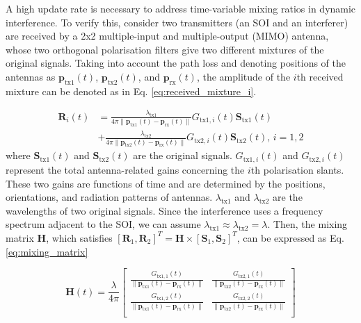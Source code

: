 \documentclass[pdflatex,mathphys]{sty}%
\begin{document}
A high update rate is necessary to address time-variable mixing ratios in dynamic interference. To verify this, consider two transmitters (an SOI and an interferer) are received by a 2x2 multiple-input and multiple-output (MIMO) antenna, whose two orthogonal polarisation filters give two different mixtures of the original signals. Taking into account the path loss and denoting positions of the antennas as $\textbf{p}_{\textrm{tx1}}(t)$, $\textbf{p}_{\textrm{tx2}}(t)$, and $\textbf{p}_{\textrm{rx}}(t)$, the amplitude of the $i$th received mixture can be denoted as in Eq. \ref{eq:received_mixture_i}.

\begin{equation}
\begin{aligned}
	\textbf{R}_i(t) &= \frac{\lambda_{\textrm{tx1}}}{4\pi \|\textbf{p}_{\textrm{tx1}}(t)-\textbf{p}_{\textrm{rx}}(t)\| }G_{\textrm{tx1},i}(t)\textbf{S}_{\textrm{tx1}}(t)\\
     &+\frac{\lambda_{\textrm{tx2}}}{4\pi \|\textbf{p}_{\textrm{tx2}}(t)-\textbf{p}_{\textrm{rx}}(t)\|}G_{\textrm{tx2},i}(t)\textbf{S}_{\textrm{tx2}}(t),\,i=1,2
\end{aligned}
\label{eq:received_mixture_i}
\end{equation}
where $\textbf{S}_{\textrm{tx1}}(t)$ and $\textbf{S}_{\textrm{tx2}}(t)$ are the original signals. $G_{\textrm{tx1},i}(t)$ and $G_{\textrm{tx2},i}(t)$ represent the total antenna-related gains concerning the $i$th polarisation slants. These two gains are functions of time and are determined by the positions, orientations, and radiation patterns of antennas. $\lambda_{\textrm{tx1}}$ and $\lambda_{\textrm{tx2}}$ are the wavelengths of two original signals. Since the interference uses a frequency spectrum adjacent to the SOI, we can assume $\lambda_{\textrm{tx1}} \approx \lambda_{\textrm{tx2}} = \lambda$. Then, the mixing matrix $\textbf{H}$, which satisfies $[\textbf{R}_1,\textbf{R}_2]^T = \textbf{H}\times[\textbf{S}_1,\textbf{S}_2]^T$, can be expressed as Eq. \ref{eq:mixing_matrix}

\begin{equation}
\textbf{H}(t) = \frac{\lambda}{4\pi}
\begin{bmatrix}
\frac{G_{\textrm{tx1},1}(t)}{ \|\textbf{p}_{\textrm{tx1}}(t)-\textbf{p}_{\textrm{rx}}(t)\| } & \frac{G_{\textrm{tx2},1}(t)}{ \|\textbf{p}_{\textrm{tx2}}(t)-\textbf{p}_{\textrm{rx}}(t)\| } \\
\frac{G_{\textrm{tx1},2}(t)}{ \|\textbf{p}_{\textrm{tx1}}(t)-\textbf{p}_{\textrm{rx}}(t)\| } & \frac{G_{\textrm{tx2},2}(t)}{ \|\textbf{p}_{\textrm{tx2}}(t)-\textbf{p}_{\textrm{rx}}(t)\| } \\
\end{bmatrix}
\label{eq:mixing_matrix}
\end{equation}
\end{document}
